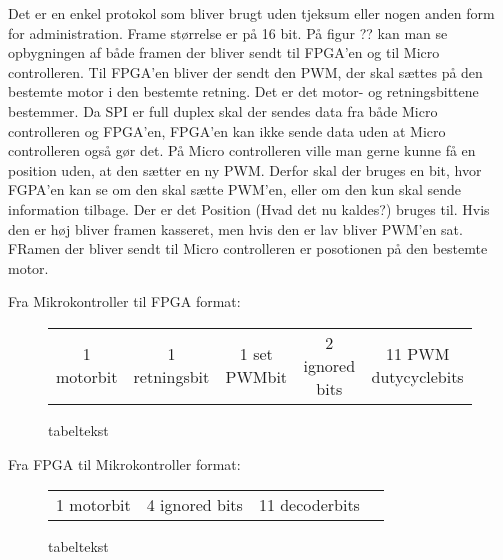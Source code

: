 Det er en enkel protokol som bliver brugt uden tjeksum eller nogen anden form for administration. Frame størrelse er på 16 bit. På figur ?? kan man se opbygningen af både framen der bliver sendt til FPGA’en og til Micro controlleren. Til FPGA’en bliver der sendt den PWM, der skal sættes på den bestemte motor i den bestemte retning. Det er det motor- og retningsbittene bestemmer. Da SPI er full duplex skal der sendes data fra både Micro controlleren og FPGA’en, FPGA’en kan ikke sende data uden at Micro controlleren også gør det. På Micro controlleren ville man gerne kunne få en position uden, at den sætter en ny PWM. Derfor skal der bruges en bit, hvor FGPA’en kan se om den skal sætte PWM’en, eller om den kun skal sende information tilbage. Der er det Position (Hvad det nu kaldes?) bruges til. Hvis den er høj bliver framen kasseret, men hvis den er lav bliver PWM’en sat. FRamen der bliver sendt til Micro controlleren er posotionen på den bestemte motor.  


  
Fra Mikrokontroller til FPGA format:
\begin{figure}[th!]
\centering
\begin{tabular}{c|c|c|c|c}
1 motorbit &1 retningsbit & 1 set PWMbit & 2 ignored bits & 11 PWM dutycyclebits
\end{tabular}
\captionsetup{type=figure}
\caption[tekst i indholdsfortegnelsen]{tabeltekst}
\label{tb:}
\end{figure}

   
  
  Fra FPGA til Mikrokontroller format:
 \begin{figure}[th!]
 \centering
 \begin{tabular}{c|c|c|c}
 1 motorbit & 4 ignored bits & 11 decoderbits
  
 \end{tabular}
 \captionsetup{type=figure}
 \caption[tekst i indholdsfortegnelsen]{tabeltekst}
 \label{tb:}
 \end{figure}
